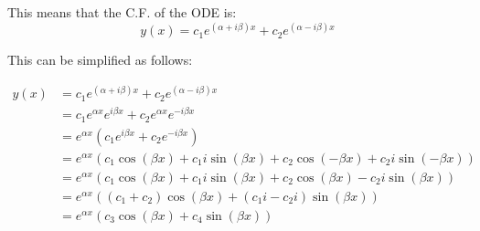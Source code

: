 \documentclass[11pt,a4paper,oneside]{book}
\begin{document}
This means that the C.F. of the ODE is:
\[y(x) = c_1e^{(\alpha + i\beta)x}+c_2e^{(\alpha - i\beta)x}\]

This can be simplified as follows:

\begin{align*}
y(x)
&= c_1e^{(\alpha + i\beta)x}+c_2e^{(\alpha - i\beta)x}\\
&= c_1e^{\alpha x} e^{i\beta x}+c_2e^{\alpha x}e^{- i\beta x}\\
&= e^{\alpha x}\left(c_1e^{i\beta x}+c_2e^{- i\beta x}\right)\\
&= e^{\alpha x}\left(c_1\cos(\beta x) + c_1i\sin(\beta x) +c_2\cos(-\beta x) + c_2i\sin(-\beta x)\right)\\
&= e^{\alpha x}\left(c_1\cos(\beta x) + c_1i\sin(\beta x) +c_2\cos(\beta x) - c_2i\sin(\beta x)\right)\\
&= e^{\alpha x}\left((c_1+c_2)\cos(\beta x) + (c_1i-c_2i)\sin(\beta x)\right)\\
&= e^{\alpha x}\left(c_3\cos(\beta x) + c_4\sin(\beta x)\right)\\
\end{align*}
\end{document}
